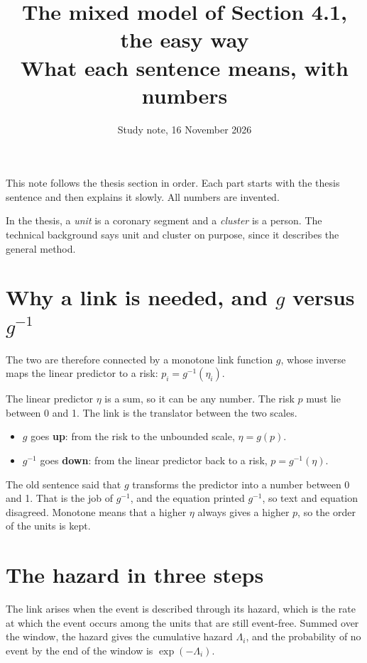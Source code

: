 \documentclass[11pt]{article}
\title{The mixed model of Section 4.1, the easy way\\[2pt]\large What each sentence means, with numbers}
\author{Study note, 16 November 2026}
\date{}
\begin{document}
\maketitle

This note follows the thesis section in order. Each part starts with the thesis sentence and then
explains it slowly. All numbers are invented.

In the thesis, a \emph{unit} is a coronary segment and a \emph{cluster} is a person. The technical
background says unit and cluster on purpose, since it describes the general method.

\section{Why a link is needed, and $g$ versus $g^{-1}$}

\begin{thesisline}
The two are therefore connected by a monotone link function $g$, whose inverse maps the linear
predictor to a risk: $p_i = g^{-1}(\eta_i)$.
\end{thesisline}

The linear predictor $\eta$ is a sum, so it can be any number. The risk $p$ must lie between 0 and 1.
The link is the translator between the two scales.

\begin{itemize}
  \item $g$ goes \textbf{up}: from the risk to the unbounded scale, $\eta = g(p)$.
  \item $g^{-1}$ goes \textbf{down}: from the linear predictor back to a risk, $p = g^{-1}(\eta)$.
\end{itemize}

The old sentence said that $g$ transforms the predictor into a number between 0 and 1. That is the
job of $g^{-1}$, and the equation printed $g^{-1}$, so text and equation disagreed. Monotone means
that a higher $\eta$ always gives a higher $p$, so the order of the units is kept.

\section{The hazard in three steps}

\begin{thesisline}
The link arises when the event is described through its hazard, which is the rate at which the event
occurs among the units that are still event-free. Summed over the window, the hazard gives the
cumulative hazard $\Lambda_i$, and the probability of no event by the end of the window is
$\exp(-\Lambda_i)$.
\end{thesisline}
\end{document}

